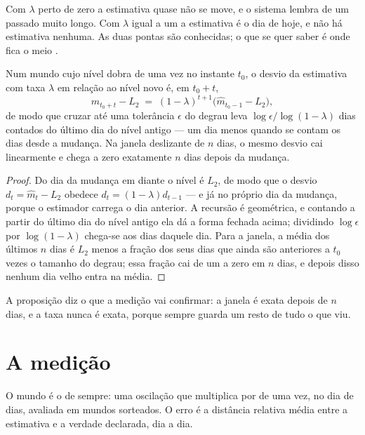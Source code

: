 Com $\lambda$ perto de zero a estimativa quase não se move, e o sistema lembra de um passado muito
longo. Com $\lambda$ igual a um a estimativa é o dia de hoje, e não há estimativa nenhuma. As duas
pontas são conhecidas; o que se quer saber é onde fica o meio \cite{dahlhaus1998optimal}.

\begin{proposicao}\label{prop:meia-vida}
Num mundo cujo nível dobra de uma vez no instante $t_0$, o desvio da estimativa com taxa $\lambda$
em relação ao nível novo é, em $t_0 + t$,
\[
\hat m_{t_0+t} - L_2 \;=\; (1-\lambda)^{t+1}\big(\hat m_{t_0-1} - L_2\big),
\]
de modo que cruzar até uma tolerância $\epsilon$ do degrau leva
$\log \epsilon / \log(1-\lambda)$ dias contados do último dia do nível antigo --- um dia menos
quando se contam os dias desde a mudança. Na janela deslizante de $n$ dias, o mesmo desvio cai
linearmente e chega a zero exatamente $n$ dias depois da mudança.
\end{proposicao}

\begin{proof}
Do dia da mudança em diante o nível é $L_2$, de modo que o desvio $d_t = \hat m_t - L_2$ obedece
$d_t = (1-\lambda) d_{t-1}$ --- e já no próprio dia da mudança, porque o estimador carrega o dia
anterior. A recursão é geométrica, e contando a partir do último dia do nível antigo ela dá a forma
fechada acima; dividindo $\log\epsilon$ por $\log(1-\lambda)$ chega-se aos dias daquele dia. Para a janela, a média dos últimos $n$ dias
é $L_2$ menos a fração dos seus dias que ainda são anteriores a $t_0$ vezes o tamanho do degrau; essa
fração cai de um a zero em $n$ dias, e depois disso nenhum dia velho entra na média.
\end{proof}

A proposição diz o que a medição vai confirmar: a janela é exata depois de $n$ dias, e a taxa nunca
é exata, porque sempre guarda um resto de tudo o que viu.

\section{A medição}

O mundo é o de sempre: uma oscilação que multiplica por \numEsquecimentoFator{} de uma vez, no dia
\numEsquecimentoQuando{} de \numEsquecimentoDiasDeSerie{} dias, avaliada em \numEsquecimentoSementes{} mundos sorteados. O erro é a distância relativa média
entre a estimativa e a verdade declarada, dia a dia.

